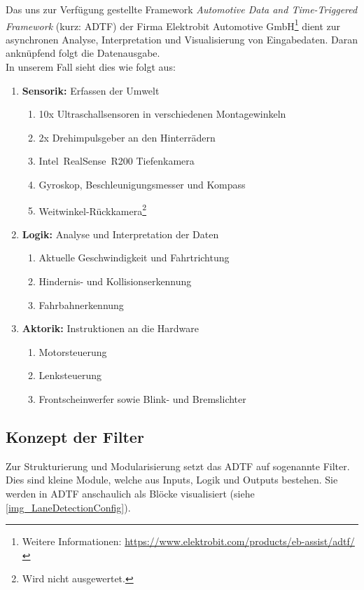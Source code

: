 \documentclass[a4paper,12pt]{report}
\begin{document}
	Das uns zur Verfügung gestellte Framework \emph{Automotive Data and Time-Triggered Framework} (kurz: ADTF) der Firma Elektrobit Automotive GmbH\footnote{Weitere Informationen: \url{https://www.elektrobit.com/products/eb-assist/adtf/}} dient zur asynchronen Analyse, Interpretation und Visualisierung von Eingabedaten. 
	Daran anknüpfend folgt die Datenausgabe.
	\\
	In unserem Fall sieht dies wie folgt aus:
	\begin{enumerate}
		\item{\textbf{Sensorik:} Erfassen der Umwelt
			\begin{enumerate}
				\item 10x Ultraschallsensoren in verschiedenen Montagewinkeln
				\item 2x Drehimpulsgeber an den Hinterrädern
				\item Intel\textregistered\ RealSense\texttrademark\ R200 Tiefenkamera
				\item Gyroskop, Beschleunigungsmesser und Kompass
				\item Weitwinkel-Rückkamera\footnote{Wird nicht ausgewertet.}
			\end{enumerate}
		}
		\item{\textbf{Logik:} Analyse und Interpretation der Daten
			\begin{enumerate}
				\item Aktuelle Geschwindigkeit und Fahrtrichtung
				\item Hindernis- und Kollisionserkennung
				\item Fahrbahnerkennung
			\end{enumerate}
		}
		\item{\textbf{Aktorik:} Instruktionen an die Hardware
			\begin{enumerate}
				\item Motorsteuerung
				\item Lenksteuerung
				\item Frontscheinwerfer sowie Blink- und Bremslichter
			\end{enumerate}
		}
	\end{enumerate}
	
\subsection{Konzept der Filter}
	
	Zur Strukturierung und Modularisierung setzt das ADTF auf sogenannte Filter.
	Dies sind kleine Module, welche aus Inputs, Logik und Outputs bestehen.
	Sie werden in ADTF anschaulich als Blöcke visualisiert (siehe \autoref{img_LaneDetectionConfig}).
	
\end{document}

